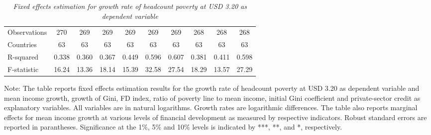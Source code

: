 \documentclass[12pt, a4paper]{article}
\begin{document}
\begin{table}[htbp]
\begin{threeparttable}
{\begin{tabular}{l*{9}{c}}
				\hline
				Observations        &         270         &         269         &         269         &         269         &         269         &         269         &         268         &         268         &         268         \\
				Countries           &          63         &          63         &          63         &          63         &          63         &          63         &          63         &          63         &          63         \\
				R-squared           &       0.338         &       0.360         &       0.367         &       0.449         &       0.596         &       0.607         &       0.381         &       0.411         &       0.598         \\
				F-statistic         &       16.24         &       13.36         &       18.14         &       15.39         &       32.58         &       27.54         &       18.29         &       13.57         &       27.29         \\
				\hline\hline
			\end{tabular}
		}
		\begin{tablenotes}
			\item \scriptsize{Note: The table reports fixed effects estimation results for the growth rate of headcount poverty at USD 3.20 as dependent variable and mean income growth, growth of Gini, FD index, ratio of poverty line to mean income, initial Gini coefficient and private-sector credit as explanatory variables. All variables are in natural logarithms. Growth rates are logarithmic differences. The table also reports marginal effects for mean income growth at various levels of financial development as measured by respective indicators. Robust standard errors are reported in parantheses. Significance at the 1\%, 5\% and 10\% levels is indicated by ***, **, and *, respectively.}
		\end{tablenotes}
	\end{threeparttable}
	\caption[Fixed Effects Estimation Results for Headcount Poverty at USD 3.20]{\textit{Fixed effects estimation for growth rate of headcount poverty at USD 3.20 as dependent variable}}
	\label{FE320}
\end{table}
\end{document}

